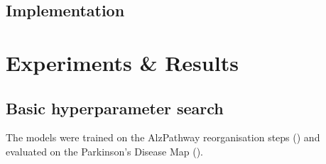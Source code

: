 \documentclass[
	fontsize=10pt, %
	twoside=false, %
	secnumdepth=1, %
]{kaobook}
\begin{document}


\section{Implementation}




% 



\chapter{Experiments \& Results}
\label{sec:experiments-results}









\section{Basic hyperparameter search}

The models were trained on the AlzPathway reorganisation steps (\ADMap)
and evaluated on the Parkinson's Disease Map (\PDMap). 
\end{document}
